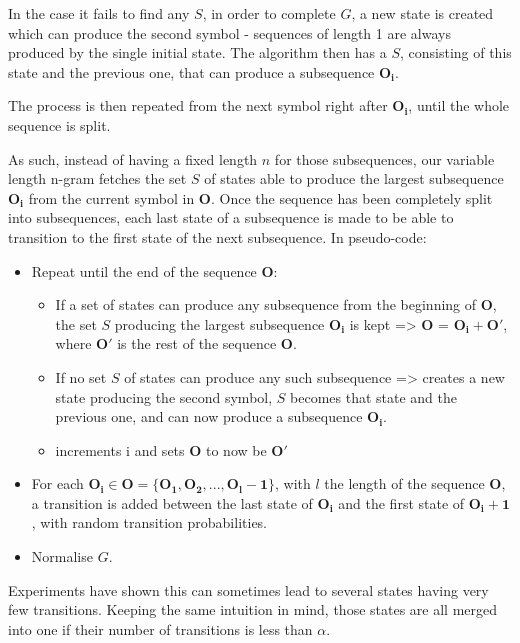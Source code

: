 In the case it fails to find any $S$, in order to complete $G$, a new state is created which can produce the second symbol - sequences of length 1 are always produced by the single initial state. The algorithm then has a $S$, consisting of this state and the previous one, that can produce a subsequence $\mathbf{O_i}$.

The process is then repeated from the next symbol right after $\mathbf{O_i}$, until the whole sequence is split.

As such, instead of having a fixed length $n$ for those subsequences, our variable length n-gram fetches the set $S$ of states able to produce the largest subsequence $\mathbf{O_i}$ from the current symbol in $\mathbf{O}$. Once the sequence has been completely split into subsequences, each last state of a subsequence is made to be able to transition to the first state of the next subsequence. In pseudo-code:

\begin{itemize}
	\item Repeat until the end of the sequence $\mathbf{O}$:
	\begin{itemize}
		\item If a set of states can produce any subsequence from the beginning of $\mathbf{O}$, the set $S$ producing the largest subsequence $\mathbf{O_i}$ is kept => $\mathbf{O}$ = $\mathbf{O_i} + \mathbf{O'}$, where $\mathbf{O'}$ is the rest of the sequence $\mathbf{O}$.
		\item If no set $S$ of states can produce any such subsequence => creates a new state producing the second symbol, $S$ becomes that state and the previous one, and can now produce a subsequence $\mathbf{O_i}$.
		\item increments i and sets $\mathbf{O}$ to now be $\mathbf{O'}$
	\end{itemize}
	\item For each $\mathbf{O_i} \in \mathbf{O} = \{\mathbf{O_1}, \mathbf{O_2}, ... , \mathbf{O_l-1}\}$, with $l$ the length of the sequence $\mathbf{O}$, a transition is added between the last state of $\mathbf{O_i}$ and the first state of $\mathbf{O_i+1}$, with random transition probabilities.
	\item Normalise $G$.
\end{itemize}

Experiments have shown this can sometimes lead to several states having very few transitions. Keeping the same intuition in mind, those states are all merged into one if their number of transitions is less than $\alpha$.

